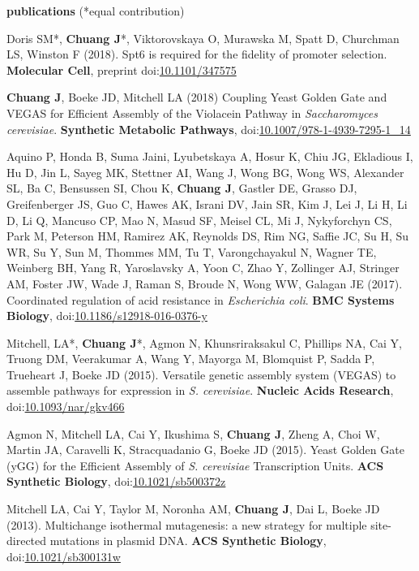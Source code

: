 \documentclass[11pt, a4paper]{article}
\begin{document}
\vspace{0.8cm}
\textbf{\Large publications} (*equal contribution)
\begin{description}[topsep=2pt, align=right, leftmargin=*, labelsep=0pt]
    \item [in press ] Doris SM*, \textbf{Chuang J}*, Viktorovskaya O, Murawska M, Spatt D, Churchman LS, Winston F (2018). Spt6 is required for the fidelity of promoter selection. \textbf{Molecular Cell}, preprint doi:\href{https://doi.org/10.1101/347575}{10.1101/347575}
    \item [2018 ] \textbf{Chuang J}, Boeke JD, Mitchell LA (2018) Coupling Yeast Golden Gate and VEGAS for Efficient Assembly of the Violacein Pathway in \textit{Saccharomyces cerevisiae}. \textbf{Synthetic Metabolic Pathways}, doi:\href{https://doi.org/10.1007/978-1-4939-7295-1_14}{10.1007/978-1-4939-7295-1\_14}
    \item [2017 ] Aquino P, Honda B, Suma Jaini, Lyubetskaya A, Hosur K, Chiu JG, Ekladious I, Hu D, Jin L, Sayeg MK, Stettner AI, Wang J, Wong BG, Wong WS, Alexander SL, Ba C, Bensussen SI, Chou K, \textbf{Chuang J}, Gastler DE, Grasso DJ, Greifenberger JS, Guo C, Hawes AK, Israni DV, Jain SR, Kim J, Lei J, Li H, Li D, Li Q, Mancuso CP, Mao N, Masud SF, Meisel CL, Mi J, Nykyforchyn CS, Park M, Peterson HM, Ramirez AK, Reynolds DS, Rim NG, Saffie JC, Su H, Su WR, Su Y, Sun M, Thommes MM, Tu T, Varongchayakul N, Wagner TE, Weinberg BH, Yang R, Yaroslavsky A, Yoon C, Zhao Y, Zollinger AJ, Stringer AM, Foster JW, Wade J, Raman S, Broude N, Wong WW, Galagan JE (2017). Coordinated regulation of acid resistance in \textit{Escherichia coli}. \textbf{BMC Systems Biology}, doi:\href{https://doi.org/10.1186/s12918-016-0376-y}{10.1186/s12918-016-0376-y}
    \item [2015 ] Mitchell, LA*, \textbf{Chuang J}*, Agmon N, Khunsriraksakul C, Phillips NA, Cai Y, Truong DM, Veerakumar A, Wang Y, Mayorga M, Blomquist P, Sadda P, Trueheart J, Boeke JD (2015). Versatile genetic assembly system (VEGAS) to assemble pathways for expression in \textit{S. cerevisiae}. \textbf{Nucleic Acids Research}, doi:\href{https://doi.org/10.1093/nar/gkv466}{10.1093/nar/gkv466}
    \item [2015 ] Agmon N, Mitchell LA, Cai Y, Ikushima S, \textbf{Chuang J}, Zheng A, Choi W, Martin JA, Caravelli K, Stracquadanio G, Boeke JD (2015). Yeast Golden Gate (yGG) for the Efficient Assembly of \textit{S. cerevisiae} Transcription Units. \textbf{ACS Synthetic Biology}, doi:\href{https://doi.org/10.1021/sb500372z}{10.1021/sb500372z}
    \item [2013 ] Mitchell LA, Cai Y, Taylor M, Noronha AM, \textbf{Chuang J}, Dai L, Boeke JD (2013). Multichange isothermal mutagenesis: a new strategy for multiple site-directed mutations in plasmid DNA. \textbf{ACS Synthetic Biology}, doi:\href{https://doi.org/10.1021/sb300131w}{10.1021/sb300131w}
\end{description}
\end{document}
